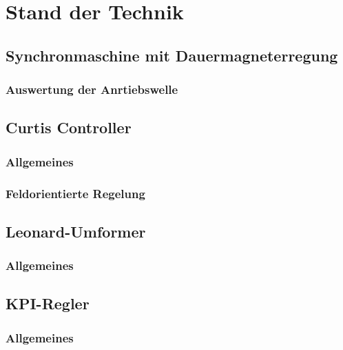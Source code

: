 \chapter{Stand der Technik}


\section{Synchronmaschine mit Dauermagneterregung}
\subsection{Auswertung der Anrtiebswelle}

\section{Curtis Controller}
\subsection{Allgemeines}
\subsection{Feldorientierte Regelung}

\section{Leonard-Umformer}
\subsection{Allgemeines}
\subsection{ }

\section{KPI-Regler}
\subsection{Allgemeines}
\subsection{ }